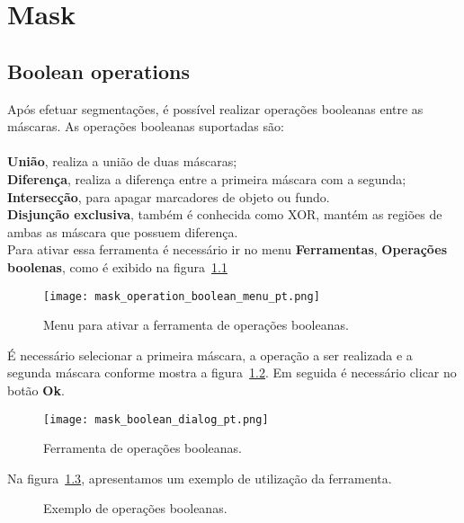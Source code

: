 \chapter{Mask}


\section{Boolean operations}

Após efetuar segmentações, é possível realizar operações booleanas entre as máscaras. As operações booleanas suportadas são:\\
\\
\textbf{União}, realiza a união de duas máscaras;\\
\textbf{Diferença}, realiza a diferença entre a primeira máscara com a segunda;\\
\textbf{Intersecção}, para apagar marcadores de objeto ou fundo.\\
\textbf{Disjunção exclusiva}, também é conhecida como XOR, mantém as regiões de ambas as máscara que possuem diferença.\\

Para ativar essa ferramenta é necessário ir no menu \textbf{Ferramentas}, \textbf{Operações boolenas}, como é exibido na figura~\ref{fig:booleano_menu} 

\begin{figure}[!htb]
\centering
\texttt{[image: mask\_operation\_boolean\_menu\_pt.png]}
\caption{Menu para ativar a ferramenta de operações booleanas.}
\label{fig:booleano_menu}
\end{figure}

É necessário selecionar a primeira máscara, a operação a ser realizada e a segunda máscara conforme mostra a figura~\ref{fig:booleano_janela}. Em seguida é necessário clicar no botão \textbf{Ok}.

\begin{figure}[!htb]
\centering
\texttt{[image: mask\_boolean\_dialog\_pt.png]}
\caption{Ferramenta de operações booleanas.}
\label{fig:booleano_janela}
\end{figure}

Na figura~\ref{fig:op_boolana}, apresentamos um exemplo de utilização da ferramenta.

\begin{figure}[!htb]
  \centering
  \hfill
  \hfill  
  \hfill  
  \hfill  
  \hfill  
  \caption{Exemplo de operações booleanas.}
  \label{fig:op_boolana}
\end{figure}

